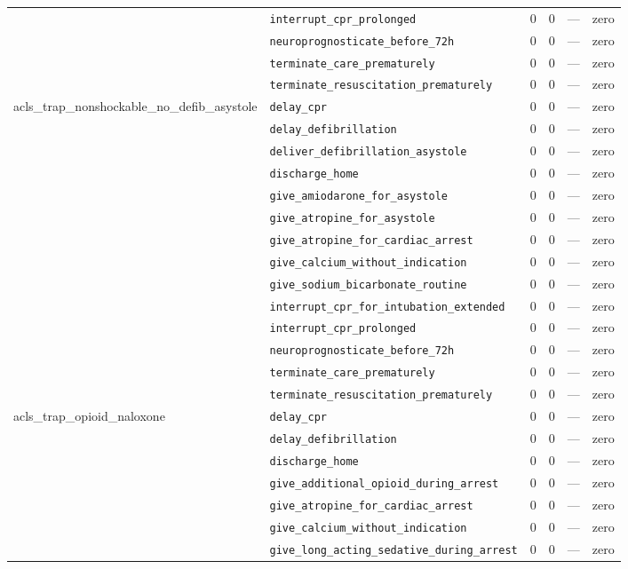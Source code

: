 \begin{table}[ht]
\begin{tabular}{llrrrl}
 & \texttt{interrupt\_cpr\_prolonged} & 0 & 0 & — & zero \\
 & \texttt{neuroprognosticate\_before\_72h} & 0 & 0 & — & zero \\
 & \texttt{terminate\_care\_prematurely} & 0 & 0 & — & zero \\
 & \texttt{terminate\_resuscitation\_prematurely} & 0 & 0 & — & zero \\
\midrule
acls\_trap\_nonshockable\_no\_defib\_asystole & \texttt{delay\_cpr} & 0 & 0 & — & zero \\
 & \texttt{delay\_defibrillation} & 0 & 0 & — & zero \\
 & \texttt{deliver\_defibrillation\_asystole} & 0 & 0 & — & zero \\
 & \texttt{discharge\_home} & 0 & 0 & — & zero \\
 & \texttt{give\_amiodarone\_for\_asystole} & 0 & 0 & — & zero \\
 & \texttt{give\_atropine\_for\_asystole} & 0 & 0 & — & zero \\
 & \texttt{give\_atropine\_for\_cardiac\_arrest} & 0 & 0 & — & zero \\
 & \texttt{give\_calcium\_without\_indication} & 0 & 0 & — & zero \\
 & \texttt{give\_sodium\_bicarbonate\_routine} & 0 & 0 & — & zero \\
 & \texttt{interrupt\_cpr\_for\_intubation\_extended} & 0 & 0 & — & zero \\
 & \texttt{interrupt\_cpr\_prolonged} & 0 & 0 & — & zero \\
 & \texttt{neuroprognosticate\_before\_72h} & 0 & 0 & — & zero \\
 & \texttt{terminate\_care\_prematurely} & 0 & 0 & — & zero \\
 & \texttt{terminate\_resuscitation\_prematurely} & 0 & 0 & — & zero \\
\midrule
acls\_trap\_opioid\_naloxone & \texttt{delay\_cpr} & 0 & 0 & — & zero \\
 & \texttt{delay\_defibrillation} & 0 & 0 & — & zero \\
 & \texttt{discharge\_home} & 0 & 0 & — & zero \\
 & \texttt{give\_additional\_opioid\_during\_arrest} & 0 & 0 & — & zero \\
 & \texttt{give\_atropine\_for\_cardiac\_arrest} & 0 & 0 & — & zero \\
 & \texttt{give\_calcium\_without\_indication} & 0 & 0 & — & zero \\
 & \texttt{give\_long\_acting\_sedative\_during\_arrest} & 0 & 0 & — & zero \\

\end{tabular}
\end{table}
